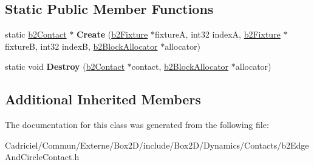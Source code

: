 \subsection*{Static Public Member Functions}
\begin{DoxyCompactItemize}
\item 
static \hyperlink{classb2_contact}{b2\+Contact} $\ast$ {\bfseries Create} (\hyperlink{classb2_fixture}{b2\+Fixture} $\ast$fixtureA, int32 indexA, \hyperlink{classb2_fixture}{b2\+Fixture} $\ast$fixtureB, int32 indexB, \hyperlink{classb2_block_allocator}{b2\+Block\+Allocator} $\ast$allocator)\hypertarget{classb2_edge_and_circle_contact_ad253e184d26e54c60fa874b329f9737e}{}\label{classb2_edge_and_circle_contact_ad253e184d26e54c60fa874b329f9737e}

\item 
static void {\bfseries Destroy} (\hyperlink{classb2_contact}{b2\+Contact} $\ast$contact, \hyperlink{classb2_block_allocator}{b2\+Block\+Allocator} $\ast$allocator)\hypertarget{classb2_edge_and_circle_contact_a7d77dd43691dad8d813450aefdb1e11e}{}\label{classb2_edge_and_circle_contact_a7d77dd43691dad8d813450aefdb1e11e}

\end{DoxyCompactItemize}
\subsection*{Additional Inherited Members}


The documentation for this class was generated from the following file\+:\begin{DoxyCompactItemize}
\item 
Cadriciel/\+Commun/\+Externe/\+Box2\+D/include/\+Box2\+D/\+Dynamics/\+Contacts/b2\+Edge\+And\+Circle\+Contact.\+h\end{DoxyCompactItemize}
